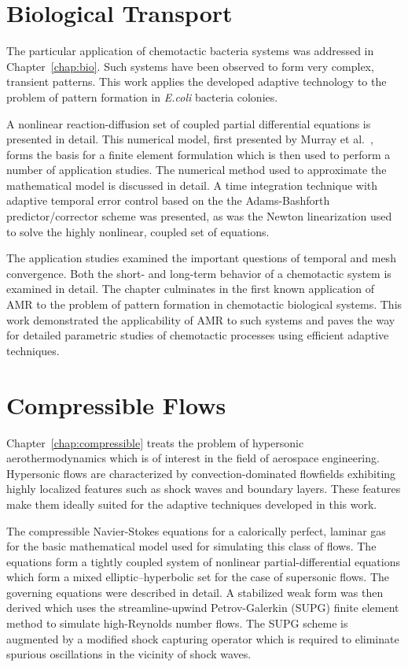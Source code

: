 \section{Biological Transport}
\enlargethispage{\baselineskip}
The particular application of chemotactic bacteria systems was addressed in Chapter~\ref{chap:bio}.  Such systems have been observed to form very complex, transient patterns.  This work applies the developed adaptive technology to the problem of pattern formation in \emph{E.coli} bacteria colonies.

A nonlinear reaction-diffusion set of coupled partial differential equations is presented in detail.  This numerical model, first presented by Murray et al.~\cite{spatial_patters_in_bio}, forms the basis for a finite element formulation which is then used to perform a number of application studies.  The numerical method used to approximate the mathematical model is discussed in detail. A time integration technique with adaptive temporal error control based on the the Adams-Bashforth predictor/corrector scheme was presented, as was the Newton linearization used to solve the highly nonlinear, coupled set of equations.

The application studies examined the important questions of temporal and mesh convergence.  Both the short- and long-term behavior of a chemotactic system is examined in detail.  The chapter culminates in the first known application of AMR to the problem of pattern formation in chemotactic biological systems.  This work demonstrated the applicability of AMR to such systems and paves the way for detailed parametric studies of chemotactic processes using efficient adaptive techniques.

\section{Compressible Flows}

Chapter~\ref{chap:compressible} treats the problem of hypersonic aerothermodynamics which is of interest in the field of aerospace engineering.  Hypersonic flows are characterized by convection-dominated flowfields exhibiting highly localized features such as shock waves and boundary layers.  These features make them ideally suited for the adaptive techniques developed in this work.

The compressible Navier-Stokes equations for a calorically perfect, laminar gas for the basic mathematical model used for simulating this class of flows.  The equations form a tightly coupled system of nonlinear partial-differential equations which form a mixed elliptic--hyperbolic set for the case of supersonic flows.  The governing equations were described in detail.  A stabilized weak form was then derived which uses the streamline-upwind Petrov-Galerkin (SUPG) finite element method to simulate high-Reynolds number flows.  The SUPG scheme is augmented by a modified shock capturing operator which is required to eliminate spurious oscillations in the vicinity of shock waves.


